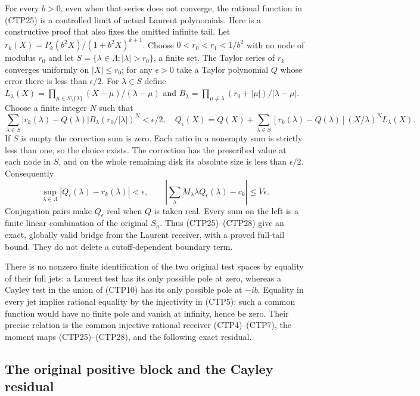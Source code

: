 For every $b>0$, even when that series does not converge, the
rational function in (CTP25) is a controlled limit of actual
Laurent polynomials. Here is a constructive proof that also fixes
the omitted infinite tail. Let
$r_k(X)=P_k(b^2X)/(1+b^2X)^{k+1}$. Choose
$0<r_0<r_1<1/b^2$ with no node of modulus $r_0$ and let
$S=\{\lambda\in\Lambda:|\lambda|>r_0\}$, a finite set.
The Taylor series of $r_k$ converges uniformly on $|X|\le r_0$;
for any $\epsilon>0$ take a Taylor polynomial $Q$ whose error there
is less than $\epsilon/2$. For $\lambda\in S$ define
$L_\lambda(X)=\prod_{\mu\in S\setminus\{\lambda\}}
(X-\mu)/(\lambda-\mu)$ and
$B_\lambda=\prod_{\mu\ne\lambda}(r_0+|\mu|)/|\lambda-\mu|$.
Choose a finite integer $N$ such that
\begin{equation}\tag{CTP27}
 \sum_{\lambda\in S}|r_k(\lambda)-Q(\lambda)|B_\lambda
                   (r_0/|\lambda|)^N<\epsilon/2,
 \quad
 Q_\epsilon(X)=Q(X)+\sum_{\lambda\in S}
 [r_k(\lambda)-Q(\lambda)](X/\lambda)^NL_\lambda(X).
\end{equation}
If $S$ is empty the correction sum is zero. Each ratio in a
nonempty sum is strictly less than one, so the choice exists.
The correction has the prescribed value at each node in $S$,
and on the whole remaining disk its absolute size is less than
$\epsilon/2$. Consequently
\begin{equation}\tag{CTP28}
 \sup_{\lambda\in\Lambda}|Q_\epsilon(\lambda)-r_k(\lambda)|
       <\epsilon,\qquad
 \left|\sum_\lambda M_\lambda\lambda Q_\epsilon(\lambda)-c_k\right|
       \le V\epsilon.
\end{equation}
Conjugation pairs make $Q_\epsilon$ real when $Q$ is taken real.
Every sum on the left is a finite linear combination of the
original $S_n$. Thus (CTP25)--(CTP28) give an exact, globally
valid bridge from the Laurent receiver, with a proved full-tail
bound. They do not delete a cutoff-dependent boundary term.

There is no nonzero finite identification of the two original
test spaces by equality of their full jets: a Laurent test has
its only possible pole at zero, whereas a Cayley test in the
union of (CTP10) has its only possible pole at $-ib$. Equality
in every jet implies rational equality by the injectivity in
(CTP5); such a common function would have no finite pole and
vanish at infinity, hence be zero. Their precise relation is
the common injective rational receiver (CTP4)--(CTP7), the
moment maps (CTP25)--(CTP28), and the following exact residual.

\subsection{The original positive block and the Cayley residual}

